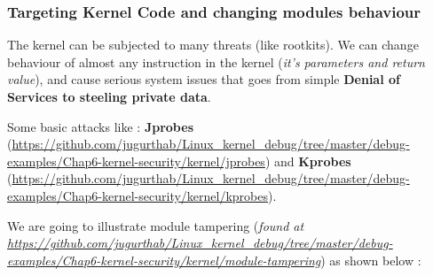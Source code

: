    			 
\begin{center}
\end{center}
\subsubsection{Targeting Kernel Code and changing modules behaviour}
The kernel can be subjected to many threats (like rootkits).
We can change behaviour of almost any instruction in the kernel (\textit{it's parameters and return value}), and cause
serious system issues that goes from simple \textbf{Denial of Services to steeling private data}.

Some basic attacks like : \textbf{Jprobes} ({\color{blue}\url{https://github.com/jugurthab/Linux_kernel_debug/tree/master/debug-examples/Chap6-kernel-security/kernel/jprobes}}) and \textbf{Kprobes} ({\color{blue}\url{https://github.com/jugurthab/Linux\_kernel\_debug/tree/master/debug-examples/Chap6-kernel-security/kernel/kprobes}}).


We are going to illustrate module tampering (\textit{found at {\color{blue}\url{https://github.com/jugurthab/Linux_kernel_debug/tree/master/debug-examples/Chap6-kernel-security/kernel/module-tampering}}}) as shown below  : 


